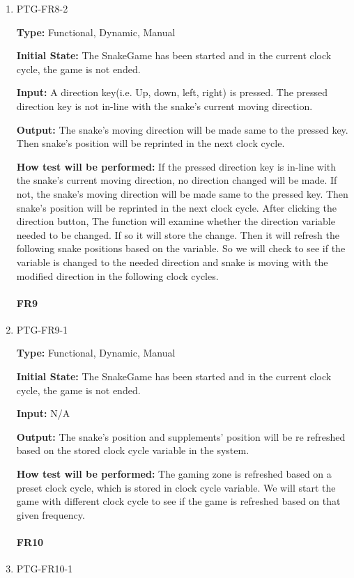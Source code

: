 \documentclass[12pt, titlepage]{article}
\begin{document}
\begin{enumerate}
\item{PTG-FR8-2\\}

\textbf{Type:} Functional, Dynamic, Manual

\textbf{Initial State:} The SnakeGame has been started and in the current clock cycle, the game is not ended.

\textbf{Input:} A direction key(i.e. Up, down, left, right) is pressed. The pressed direction key is not in-line with the snake's current moving direction.
 
\textbf{Output:} The snake's moving direction will be made same to the pressed key. Then snake's position will be reprinted in the next clock cycle.

\textbf{How test will be performed:} If the pressed direction key is in-line with the snake's current moving direction, no direction changed will be made. If not, the snake's moving direction will be made same to the pressed key. Then snake's position will be reprinted in the next clock cycle. After clicking the direction button, The function will examine whether the direction variable needed to be changed. If so it will store the change. Then it will refresh the following snake positions based on the variable. So we will check to see if the variable is changed to the needed direction and snake is moving with the modified direction in the following clock cycles.
\paragraph{FR9}
\item{PTG-FR9-1\\}

\textbf{Type:} Functional, Dynamic, Manual

\textbf{Initial State:} The SnakeGame has been started and in the current clock cycle, the game is not ended.

\textbf{Input:} N/A
 
\textbf{Output:} The snake's position and supplements' position will be re refreshed based on the stored clock cycle variable in the system.

\textbf{How test will be performed:} The gaming zone is refreshed based on a preset clock cycle, which is stored in clock cycle variable. We will start the game with different clock cycle to see if the game is refreshed based on that given frequency.
\paragraph{FR10}
\item{PTG-FR10-1\\}


\end{enumerate}
\end{document}
